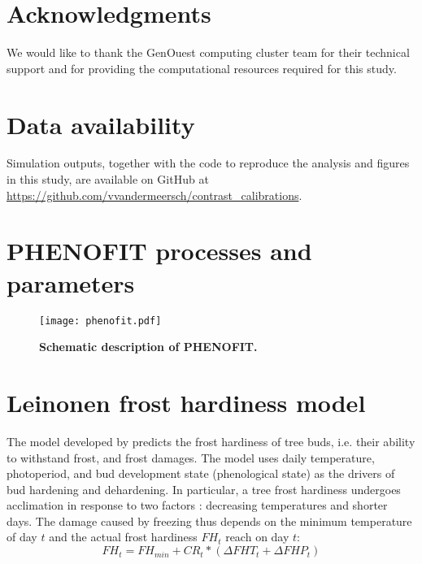 \documentclass[preprint,12pt,authoryear]{elsarticle}
\begin{document}
\section*{Acknowledgments}
\noindent We would like to thank the GenOuest computing cluster team for their technical support and for providing the computational resources required for this study.

\section*{Data availability}
\noindent Simulation outputs, together with the code to reproduce the analysis and figures in this study, are available on GitHub at \url{https://github.com/vvandermeersch/contrast_calibrations}.


\clearpage
\appendix

\section{PHENOFIT processes and parameters}
\label{sec:sample:appendix}

\begin{figure}[htpb]
\centering
\texttt{[image: phenofit.pdf]}
\caption{\textbf{Schematic description of PHENOFIT.}}
\end{figure}

\begin{landscape}

\end{landscape}
\restoregeometry

\newpage

\section{Leinonen frost hardiness model}

The model developed by \cite{Leinonen1996} predicts the frost hardiness of tree buds, i.e. their ability to withstand frost, and frost damages. The model uses daily temperature, photoperiod, and bud development state (phenological state) as the drivers of bud hardening and dehardening. In particular, a tree frost hardiness undergoes acclimation in response to two factors : decreasing temperatures and shorter days. The damage caused by freezing thus depends on the minimum temperature of day $t$ and the actual frost hardiness $FH_t$ reach on day $t$:
\begin{equation}
FH_t = FH_{min} + CR_t * (\Delta FHT_t + \Delta FHP_t)
\end{equation}
\end{document}
